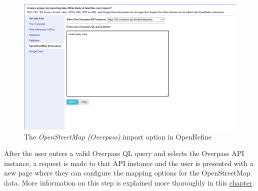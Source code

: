 \begin{figure}[H]
    \includegraphics[width=\linewidth]{./Figures/OSM_Extractor/osm_extractor_import_page.png}
    \caption{The \textit{OpenStreetMap (Overpass)} import option in OpenRefine}
\end{figure}
After the user enters a valid Overpass QL query and selects the Overpass API instance, a request is made to that API instance and
the user is presented with a new page where they can configure the mapping options for the OpenStreetMap data. More information on
this step is explained more thoroughly in this
\hyperref[sec:mapping-preparation-of-openstreetmap-data]{chapter}.

